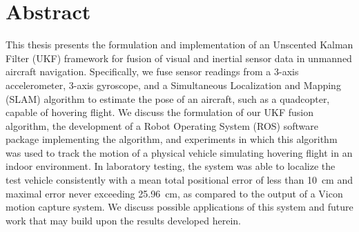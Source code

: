 \chapter*{Abstract}

This thesis presents the formulation and implementation of an Unscented Kalman Filter (UKF) framework for fusion of visual and inertial sensor data in unmanned aircraft navigation. Specifically, we fuse sensor readings from a 3-axis accelerometer, 3-axis gyroscope, and a Simultaneous Localization and Mapping (SLAM) algorithm to estimate the pose of an aircraft, such as a quadcopter, capable of hovering flight. We discuss the formulation of our UKF fusion algorithm, the development of a Robot Operating System (ROS) software package implementing the algorithm, and experiments in which this algorithm was used to track the motion of a physical vehicle simulating hovering flight in an indoor environment. In laboratory testing, the system was able to localize the test vehicle consistently with a mean total positional error of less than 10~cm and maximal error never exceeding 25.96~cm, as compared to the output of a Vicon motion capture system. We discuss possible applications of this system and future work that may build upon the results developed herein.